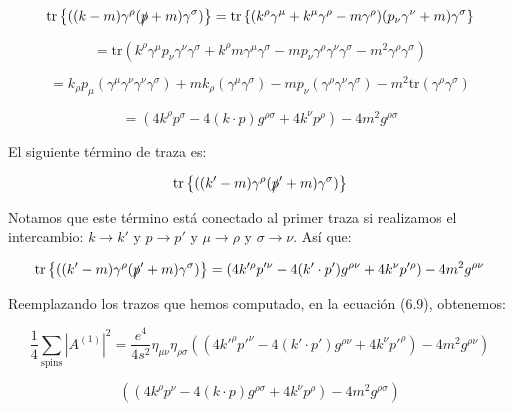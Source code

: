 \begin{equation}
\text{tr} \left\{ ((k - m) \gamma^\rho (\slashed{p} + m) \gamma^\sigma) \right\} = \text{tr} \left\{ (k^\rho \gamma^\mu + k^\mu \gamma^\rho - m \gamma^\rho)(p_\nu \gamma^\nu + m) \gamma^\sigma \right\}
\end{equation}

\begin{equation}
= \text{tr}(k^\rho \gamma^\mu p_\nu \gamma^\nu \gamma^\sigma + k^\rho m \gamma^\mu \gamma^\sigma - m p_\nu \gamma^\rho \gamma^\nu \gamma^\sigma - m^2 \gamma^\rho \gamma^\sigma)
\end{equation}

\begin{equation}
= k_\rho p_\mu (\gamma^\mu \gamma^\nu \gamma^\nu \gamma^\sigma) + m k_\rho (\gamma^\mu \gamma^\sigma) - m p_\nu (\gamma^\rho \gamma^\nu \gamma^\sigma) - m^2 \text{tr}(\gamma^\rho \gamma^\sigma)
\end{equation}

\begin{equation}
= (4k^\rho p^\sigma - 4(k \cdot p)g^{\rho\sigma} + 4k^\nu p^\rho) - 4m^2 g^{\rho\sigma}
\end{equation}

El siguiente término de traza es:

\begin{equation}
\text{tr} \left\{ ((k' - m) \gamma^\rho (\slashed{p}' + m) \gamma^\sigma) \right\}
\end{equation}

Notamos que este término está conectado al primer traza si realizamos el intercambio: $ k \to k' $ y $ p \to p' $ y $ \mu \to \rho $ y $ \sigma \to \nu $. Así que:

\begin{equation}
\text{tr} \left\{ ((k' - m) \gamma^\rho (\slashed{p}' + m) \gamma^\sigma) \right\} = (4k'^\rho p'^\nu - 4(k' \cdot p')g^{\rho\nu} + 4k^\nu p'^\rho) - 4m^2 g^{\rho\nu}
\end{equation}

Reemplazando los trazos que hemos computado, en la ecuación (6.9), obtenemos:

\begin{equation}
\frac{1}{4} \sum_{\text{spins}} |A^{(1)}|^2 = \frac{e^4}{4s^2} \eta_{\mu\nu} \eta_{\rho\sigma} ((4k'^\rho p'^\nu - 4(k' \cdot p')g^{\rho\nu} + 4k^\nu p'^\rho) - 4m^2 g^{\rho\nu})
\end{equation}

\begin{equation}
((4k^\rho p^\nu - 4(k \cdot p)g^{\rho\sigma} + 4k^\nu p^\rho) - 4m^2 g^{\rho\sigma})
\end{equation}

